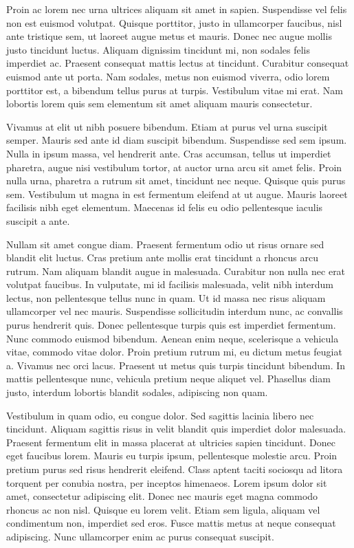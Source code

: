 Proin ac lorem nec urna ultrices aliquam sit amet in sapien.
Suspendisse vel felis non est euismod volutpat.
Quisque porttitor, justo in ullamcorper faucibus, nisl ante tristique sem, ut laoreet augue metus et mauris.
Donec nec augue mollis justo tincidunt luctus.
Aliquam dignissim tincidunt mi, non sodales felis imperdiet ac.
Praesent consequat mattis lectus at tincidunt.
Curabitur consequat euismod ante ut porta.
Nam sodales, metus non euismod viverra, odio lorem porttitor est, a bibendum tellus purus at turpis.
Vestibulum vitae mi erat.
Nam lobortis lorem quis sem elementum sit amet aliquam mauris consectetur.

Vivamus at elit ut nibh posuere bibendum.
Etiam at purus vel urna suscipit semper.
Mauris sed ante id diam suscipit bibendum.
Suspendisse sed sem ipsum.
Nulla in ipsum massa, vel hendrerit ante.
Cras accumsan, tellus ut imperdiet pharetra, augue nisi vestibulum tortor, at auctor urna arcu sit amet felis.
Proin nulla urna, pharetra a rutrum sit amet, tincidunt nec neque.
Quisque quis purus sem.
Vestibulum ut magna in est fermentum eleifend at ut augue.
Mauris laoreet facilisis nibh eget elementum.
Maecenas id felis eu odio pellentesque iaculis suscipit a ante.

Nullam sit amet congue diam.
Praesent fermentum odio ut risus ornare sed blandit elit luctus.
Cras pretium ante mollis erat tincidunt a rhoncus arcu rutrum.
Nam aliquam blandit augue in malesuada.
Curabitur non nulla nec erat volutpat faucibus.
In vulputate, mi id facilisis malesuada, velit nibh interdum lectus, non pellentesque tellus nunc in quam.
Ut id massa nec risus aliquam ullamcorper vel nec mauris.
Suspendisse sollicitudin interdum nunc, ac convallis purus hendrerit quis.
Donec pellentesque turpis quis est imperdiet fermentum.
Nunc commodo euismod bibendum.
Aenean enim neque, scelerisque a vehicula vitae, commodo vitae dolor.
Proin pretium rutrum mi, eu dictum metus feugiat a.
Vivamus nec orci lacus.
Praesent ut metus quis turpis tincidunt bibendum.
In mattis pellentesque nunc, vehicula pretium neque aliquet vel.
Phasellus diam justo, interdum lobortis blandit sodales, adipiscing non quam.

Vestibulum in quam odio, eu congue dolor.
Sed sagittis lacinia libero nec tincidunt.
Aliquam sagittis risus in velit blandit quis imperdiet dolor malesuada.
Praesent fermentum elit in massa placerat at ultricies sapien tincidunt.
Donec eget faucibus lorem.
Mauris eu turpis ipsum, pellentesque molestie arcu.
Proin pretium purus sed risus hendrerit eleifend.
Class aptent taciti sociosqu ad litora torquent per conubia nostra, per inceptos himenaeos.
Lorem ipsum dolor sit amet, consectetur adipiscing elit.
Donec nec mauris eget magna commodo rhoncus ac non nisl.
Quisque eu lorem velit.
Etiam sem ligula, aliquam vel condimentum non, imperdiet sed eros.
Fusce mattis metus at neque consequat adipiscing.
Nunc ullamcorper enim ac purus consequat suscipit.

